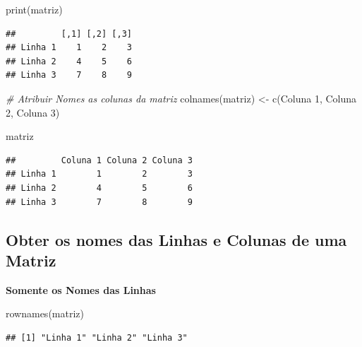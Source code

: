 \documentclass[
]{article}
\newenvironment{Shaded}{\begin{snugshade}}{\end{snugshade}}
\newcommand{\CommentTok}[1]{\textcolor[rgb]{0.56,0.35,0.01}{\textit{#1}}}
\newcommand{\FunctionTok}[1]{\textcolor[rgb]{0.00,0.00,0.00}{#1}}
\newcommand{\NormalTok}[1]{#1}
\newcommand{\OtherTok}[1]{\textcolor[rgb]{0.56,0.35,0.01}{#1}}
\newcommand{\StringTok}[1]{\textcolor[rgb]{0.31,0.60,0.02}{#1}}
\begin{document}
\begin{Shaded}
\begin{Highlighting}[]
\FunctionTok{print}\NormalTok{(matriz)}
\end{Highlighting}
\end{Shaded}

\begin{verbatim}
##         [,1] [,2] [,3]
## Linha 1    1    2    3
## Linha 2    4    5    6
## Linha 3    7    8    9
\end{verbatim}

\begin{Shaded}
\begin{Highlighting}[]
\CommentTok{\# Atribuir Nomes as colunas da matriz}
\FunctionTok{colnames}\NormalTok{(matriz) }\OtherTok{\textless{}{-}} \FunctionTok{c}\NormalTok{(}\StringTok{\textquotesingle{}Coluna 1\textquotesingle{}}\NormalTok{, }\StringTok{\textquotesingle{}Coluna 2\textquotesingle{}}\NormalTok{, }\StringTok{\textquotesingle{}Coluna 3\textquotesingle{}}\NormalTok{)}
\end{Highlighting}
\end{Shaded}

\begin{Shaded}
\begin{Highlighting}[]
\NormalTok{matriz}
\end{Highlighting}
\end{Shaded}

\begin{verbatim}
##         Coluna 1 Coluna 2 Coluna 3
## Linha 1        1        2        3
## Linha 2        4        5        6
## Linha 3        7        8        9
\end{verbatim}

\hypertarget{obter-os-nomes-das-linhas-e-colunas-de-uma-matriz}{%
\subsection{Obter os nomes das Linhas e Colunas de uma
Matriz}\label{obter-os-nomes-das-linhas-e-colunas-de-uma-matriz}}

\textbf{Somente os Nomes das Linhas}

\begin{Shaded}
\begin{Highlighting}[]
\FunctionTok{rownames}\NormalTok{(matriz)}
\end{Highlighting}
\end{Shaded}

\begin{verbatim}
## [1] "Linha 1" "Linha 2" "Linha 3"
\end{verbatim}
\end{document}
